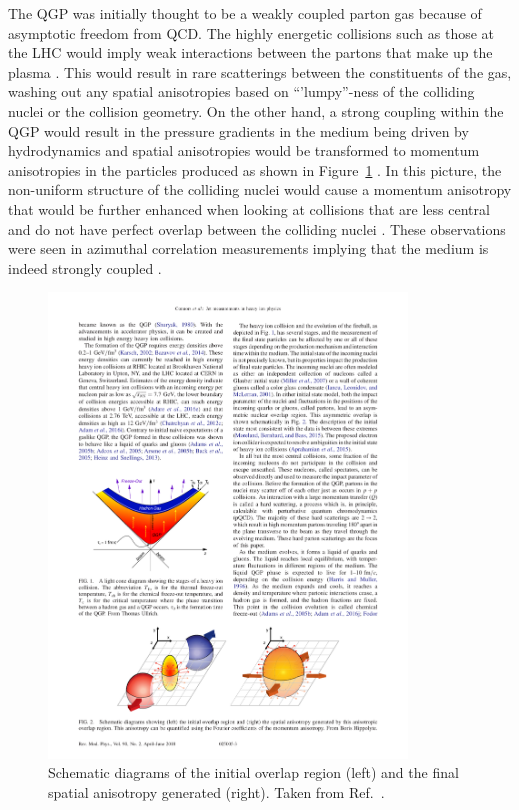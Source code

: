 The QGP was initially thought to be a weakly coupled parton gas because of asymptotic freedom from QCD.
The highly energetic collisions such as those at the LHC would imply weak interactions between the partons that make up the plasma \cite{PhysRevLett.34.1353, heinz2013collective, 10.1007/978-1-4020-2705-5_14}.
This would result in rare scatterings between the constituents of the gas, washing out any spatial anisotropies based on ``'lumpy''-ness of the colliding nuclei or the collision geometry.
On the other hand, a strong coupling within the QGP would result in the pressure gradients in the medium being driven by hydrodynamics and spatial anisotropies would be transformed to momentum anisotropies in the particles produced as shown in Figure~\ref{fig:overlap} \cite{Busza:2018rrf}.
In this picture, the non-uniform structure of the colliding nuclei would cause a momentum anisotropy \cite{Ster:1999ib} that would be further enhanced when looking at collisions that are less central and do not have perfect overlap between the colliding nuclei \cite{Poskanzer:1999ea, Pinkenburg:1999ya}.
These observations were seen in azimuthal correlation measurements implying that the medium is indeed strongly coupled \cite{Aaboud:2018ves, PhysRevLett.91.182301, Sirunyan:2017fts, PhysRevLett.116.132302}.

\begin{figure}[htbp]
\begin{center}
\includegraphics[width=0.85\textwidth]{figures/theory/overlap}
\caption{Schematic diagrams of the initial overlap region (left) and the final spatial anisotropy generated (right).
Taken from Ref.~\cite{RevModPhys.90.025005}.}
\label{fig:overlap}
\end{center}
\end{figure}


